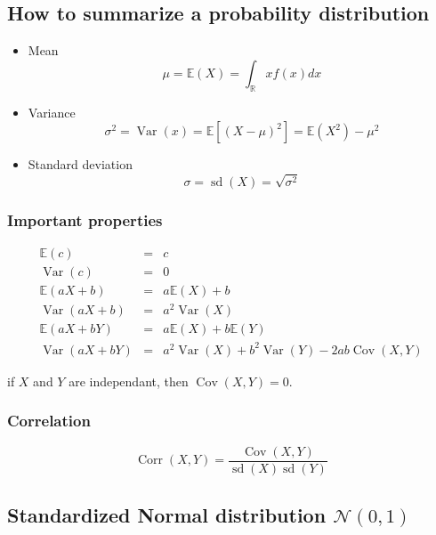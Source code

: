 \documentclass[a4paper,titlepage] {scrartcl}
\begin{document}
\subsection{How to summarize a probability distribution} %
\label{par:how_to_summarize_a_probability_distribution}
\begin{itemize}
	\item Mean
	\begin{equation}
		\mu = \mathbb{E}(X)=\int_{\mathbb R} xf(x)dx
	\end{equation}
	\item Variance
	\begin{equation}
		\sigma^2=\operatorname{Var}(x)=\mathbb E [(X-\mu)^2]=\mathbb E(X^2)-\mu^2
	\end{equation}
	\item Standard deviation 
	\begin{equation}
		\sigma = \operatorname{sd}(X)=\sqrt{\sigma^2}
	\end{equation}
\end{itemize}

\subsubsection{Important properties}
\begin{eqnarray}
	\mathbb E(c) &=& c\\
	\operatorname{Var}(c)&=&0\\
	\mathbb E(aX+b) &=& a\mathbb E(X) +b\\
	\operatorname{Var}(aX+b) &=& a^2\operatorname{Var}(X)\\
	\mathbb E(aX+bY) &=& a\mathbb E(X) +b\mathbb E(Y)\\
	\operatorname{Var}(aX+bY) &=& a^2\operatorname{Var}(X)+b^2\operatorname{Var}(Y)-2ab\operatorname{Cov}(X,Y)
\end{eqnarray}

if $X$ and $Y$ are independant, then $\operatorname{Cov}(X,Y)=0$.

\subsubsection{Correlation}
\begin{equation}
	\operatorname{Corr}(X,Y) = \frac{\operatorname{Cov}(X,Y)}{\operatorname{sd}(X)\operatorname{sd}(Y)}
\end{equation}

\subsection{Standardized Normal distribution $\mathcal N(0,1)$}
\end{document}
